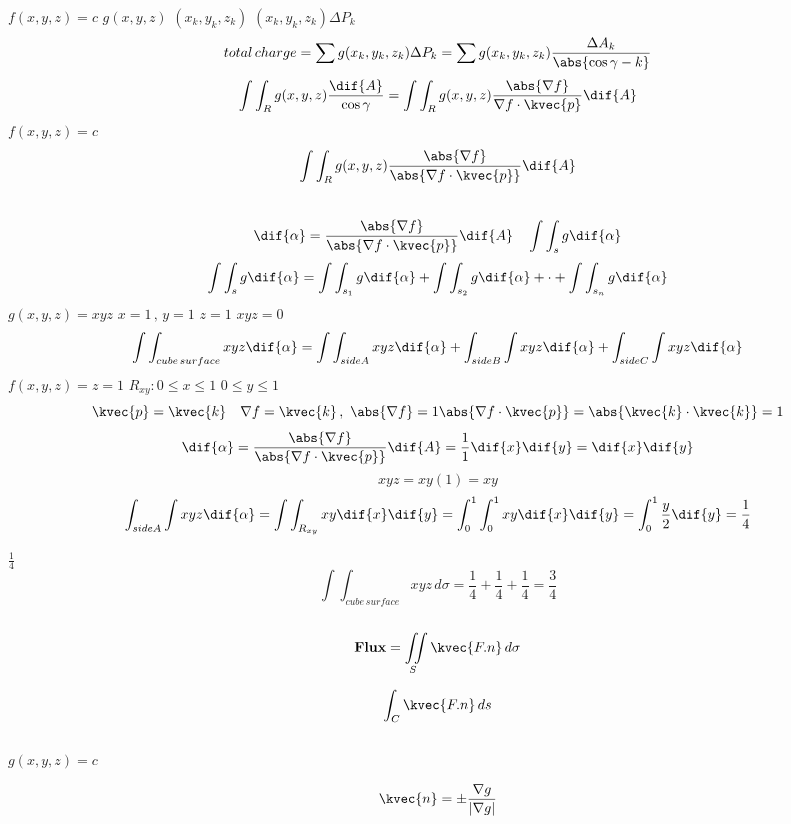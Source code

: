 \( f(x,y,z) = c  \)  
\( g(x,y,z)  \)  
\(( x_{k},y_{k},z_{k})  \)  
\( (x_{k},y_{k},z_{k})\Delta P_{k}  \)  
 \[  total \, charge = \sum g(x_{k},y_{k},z_{k})\Delta P_{k}=\sum g(x_{k},y_{k},z_{k})\frac{\Delta A_{k}}{\abs{\cos\gamma-{k}}}  \]   
\[ \int\int_{R}g(x,y,z)\frac{\dif{A}}{\cos\gamma}=\int\int_{R}g(x,y,z)\frac{\abs{\nabla f}}{\nabla f \cdot \kvec{p}}\dif{A}  \]   
\( f(x,y,z)=c  \) 
\[ \int \int_{R}g(x,y,z)\frac{\abs{\nabla f}}{\abs{\nabla f\cdot \kvec{p}}}\dif{A}   \]   
\(   \)    \[    \]   
 \[ \dif{\alpha}=\frac{\abs{\nabla f}}{\abs{\nabla f \cdot \kvec{p}}}\dif{A}  \quad \int\int_{s}g\dif{\alpha}   \]   
 \[ \int\int_{s}g\dif{\alpha}=\int\int_{s_{1}}g\dif{\alpha}+\int\int_{s_{2}}g\dif{\alpha}+\cdot+\int\int_{s_{n}} g\dif{\alpha}  \]   
\(g(x,y,z)=xyz\)
\( x=1\, , \, y=1   \)  
\( z=1  \)  
\( xyz=0  \)  
 \[\int \int_{cube\,surface} xyz\dif{\alpha}=\int\int_{side A}xyz\dif{\alpha}+\int_{side B}\int xyz\dif{\alpha}+\int_{side C}\int xyz \dif{\alpha}    \]   
\( f(x,y,z)=z=1  \) 
\( R_{xy} : 0\le x\le 1  \) 
\( 0\le y \le 1  \) 
\[ \kvec{p}=\kvec{k}\quad \nabla f=\kvec{k}  \,,\,\, \abs{\nabla f}=1 \abs{\nabla f \cdot \kvec{p}}=\abs{\kvec{k}\cdot \kvec{k}}=1   \]  
\[ \dif{\alpha}=\frac{\abs{\nabla f}}{\abs{\nabla f \cdot \kvec{p}}}\dif{A}=\frac{1}{1}\dif{x}\dif{y}=\dif{x}\dif{y}\]
\[ xyz=xy(1)=xy   \]    
\[ \int_{side A}\int xyz \dif{\alpha}=\int\int_{R_{xy}}xy\dif{x}\dif{y}=\int_{0}^{1}\int_{0}^{1} xy \dif{x}\dif{y}=\int_{0}^{1}\frac{y}{2}\dif{y}=\frac{1}{4}   \]   








\(\frac{1}{4}\)
\\
\[\int\int_{cube \,surface} xyz \,d\sigma=\frac{1}{4}+\frac{1}{4}+\frac{1}{4}= \frac{3}{4}\]
\\
\begin{equation}
\textbf{Flux}=\iint\limits_{S}\kvec{F.n}\,d\sigma
\end{equation}

\[\int_{C}\kvec{F . n}\,ds\]
\\
\(g(x,y,z)=c\)

\begin{equation}
\kvec{n}=\pm\frac{\nabla g}{|\nabla g|}
\end{equation}

